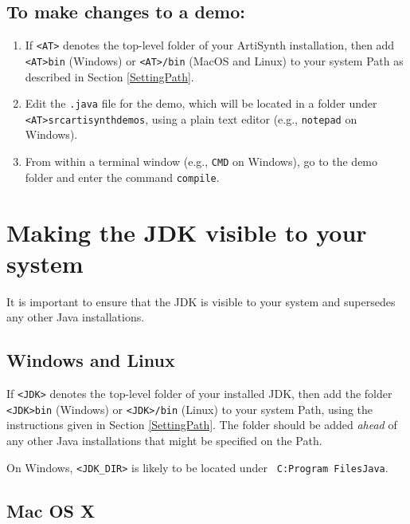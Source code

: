 \documentclass{article}
\begin{document}
\subsection{To make changes to a demo:}

\begin{enumerate}

\item If {\tt <AT>} denotes the top-level folder of your ArtiSynth
installation, then add {\tt <AT>\BKS bin} (Windows) or {\tt <AT>/bin}
(MacOS and Linux) to your system Path
as described in Section \ref{SettingPath}.

\item Edit the {\tt .java} file for the demo, which will be located
in a folder under {\tt <AT>\BKS src\BKS artisynth\BKS demos},
using a plain text editor (e.g., {\tt notepad} on Windows).

\item From within a terminal window (e.g., {\tt CMD} on Windows), go to the
demo folder and enter the command {\tt compile}.

\end{enumerate}

\section{Making the JDK visible to your system}
\label{MakingJDKVisible}

It is important to ensure that the JDK is visible to your system and
supersedes any other Java installations.

\subsection*{Windows and Linux}

If {\tt <JDK>} denotes the top-level folder of your installed JDK,
then add the folder {\tt <JDK>\BKS bin} (Windows) or {\tt <JDK>/bin}
(Linux) to your system Path, using the instructions given in Section
\ref{SettingPath}. The folder should be added {\it ahead} of any other
Java installations that might be specified on the Path.

On Windows, {\tt <JDK\_DIR>} is likely to be located under {\tt
C:\BKS Program Files\BKS Java}.

\subsection*{Mac OS X}
\end{document}
